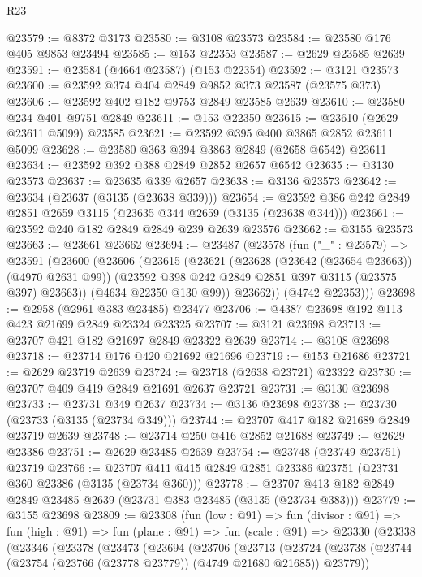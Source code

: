 \begin{lexlean}{R23}
\begin{coremodule}
@23579 := @8372 @3173
@23580 := @3108 @23573
@23584 := @23580 @176 @405 @9853 @23494
@23585 := @153 @22353
@23587 := @2629 @23585 @2639
@23591 := @23584 (@4664 @23587) (@153 @22354)
@23592 := @3121 @23573
@23600 := @23592 @374 @404 @2849 @9852 @373 @23587 (@23575 @373)
@23606 := @23592 @402 @182 @9753 @2849 @23585 @2639
@23610 := @23580 @234 @401 @9751 @2849
@23611 := @153 @22350
@23615 := @23610 (@2629 @23611 @5099) @23585
@23621 := @23592 @395 @400 @3865 @2852 @23611 @5099
@23628 := @23580 @363 @394 @3863 @2849 (@2658 @6542) @23611
@23634 := @23592 @392 @388 @2849 @2852 @2657 @6542
@23635 := @3130 @23573
@23637 := @23635 @339 @2657
@23638 := @3136 @23573
@23642 := @23634 (@23637 (@3135 (@23638 @339)))
@23654 := @23592 @386 @242 @2849 @2851 @2659 @3115 (@23635 @344 @2659 (@3135 (@23638 @344)))
@23661 := @23592 @240 @182 @2849 @2849 @239 @2639 @23576
@23662 := @3155 @23573
@23663 := @23661 @23662
@23694 := @23487
    (@23578
      (fun ("_" : @23579) =>
      @23591
        (@23600
          (@23606
            (@23615
              (@23621
                (@23628 (@23642 (@23654 @23663)) (@4970 @2631 @99))
                (@23592 @398 @242 @2849 @2851 @397 @3115 (@23575 @397) @23663))
              (@4634 @22350 @130 @99))
            @23662))
        (@4742 @22353)))
@23698 := @2958 (@2961 @383 @23485) @23477
@23706 := @4387 @23698 @192 @113 @423 @21699 @2849 @23324 @23325
@23707 := @3121 @23698
@23713 := @23707 @421 @182 @21697 @2849 @23322 @2639
@23714 := @3108 @23698
@23718 := @23714 @176 @420 @21692 @21696
@23719 := @153 @21686
@23721 := @2629 @23719 @2639
@23724 := @23718 (@2638 @23721) @23322
@23730 := @23707 @409 @419 @2849 @21691 @2637 @23721
@23731 := @3130 @23698
@23733 := @23731 @349 @2637
@23734 := @3136 @23698
@23738 := @23730 (@23733 (@3135 (@23734 @349)))
@23744 := @23707 @417 @182 @21689 @2849 @23719 @2639
@23748 := @23714 @250 @416 @2852 @21688
@23749 := @2629 @23386
@23751 := @2629 @23485 @2639
@23754 := @23748 (@23749 @23751) @23719
@23766 := @23707 @411 @415 @2849 @2851 @23386 @23751 (@23731 @360 @23386 (@3135 (@23734 @360)))
@23778 := @23707 @413 @182 @2849 @2849 @23485 @2639 (@23731 @383 @23485 (@3135 (@23734 @383)))
@23779 := @3155 @23698
@23809 := @23308
    (fun (low : @91) =>
    fun (divisor : @91) =>
    fun (high : @91) =>
    fun (plane : @91) =>
    fun (scale : @91) =>
    @23330
      (@23338
        (@23346
          (@23378
            (@23473
              (@23694
                (@23706
                  (@23713
                    (@23724
                      (@23738
                        (@23744 (@23754 (@23766 (@23778 @23779)) (@4749 @21680 @21685)) @23779))

\end{coremodule}
\end{lexlean}
